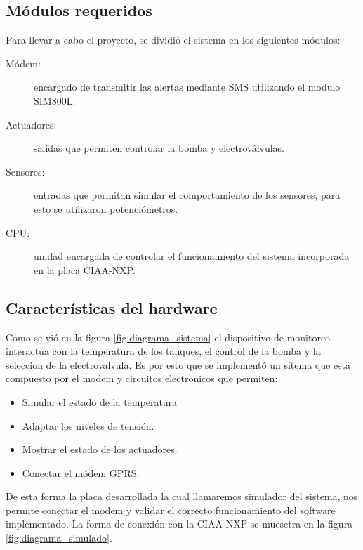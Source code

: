 \subsection{ Módulos requeridos}
Para llevar a cabo el proyecto, se dividió el sistema en los siguientes módulos:
\begin{description}
  \item[Módem:] encargado de transmitir las alertas mediante SMS utilizando el modulo SIM800L.
  \item[Actuadores:] salidas que permiten controlar la bomba y electroválvulas.
  \item[Sensores:] entradas que permitan simular el comportamiento de los sensores, para esto se utilizaron potenciómetros.
  \item[CPU:] unidad encargada de controlar el funcionamiento del sistema incorporada en la placa CIAA-NXP. 
\end{description}

\subsection{Características del hardware}

Como se vió en la figura \ref{fig:diagrama_sistema} el dispositivo de monitoreo interactua con la temperatura de los tanques, el control de la bomba y la seleccion de la electrovalvula. Es por esto que se implementó un sitema que está compuesto por el modem y circuitos electronicos que permiten:
\begin{itemize}
  \item Simular el estado de la temperatura
  \item Adaptar los niveles de tensión.
  \item Mostrar el estado de los actuadores.
  \item Conectar el módem GPRS.
\end{itemize}

    De esta forma la placa desarrollada la cual llamaremos simulador del sistema, nos permite conectar el modem y validar el correcto funcionamiento del software implementado. La forma de conexión con la CIAA-NXP se muesetra en la figura \ref{fig:diagrama_simulado}.

